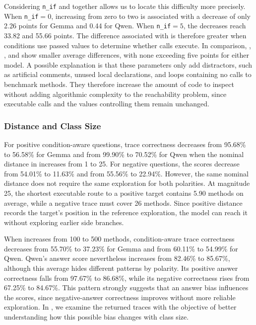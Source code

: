 

Considering \mbox{\texttt{n\_if}} and  together allows us to locate this difficulty more precisely. When \mbox{\texttt{n\_if}$=0$}, increasing  from zero to two is associated with a decrease of only 2.26 points for Gemma and 0.44 for Qwen. When \mbox{\texttt{n\_if}$=5$}, the decreases reach 33.82 and 55.66 points. The difference associated with  is therefore greater when conditions use passed values to determine whether calls execute. In comparison, , , and  show smaller average differences, with none exceeding five points for either model. A possible explanation is that these parameters only add distractors, such as artificial comments, unused local declarations, and loops containing no calls to benchmark methods. They therefore increase the amount of code to inspect without adding algorithmic complexity to the reachability problem, since executable calls and the values controlling them remain unchanged.

\subsubsection{Distance and Class Size}

For positive condition-aware questions, trace correctness decreases from 95.68\% to 56.58\% for Gemma and from 99.90\% to 70.52\% for Qwen when the nominal distance in  increases from 1 to 25. For negative questions, the scores decrease from 54.01\% to 11.63\% and from 55.56\% to 22.94\%. However, the same nominal distance does not require the same exploration for both polarities. At magnitude 25, the shortest executable route to a positive target contains 5.90 methods on average, while a negative trace must cover 26 methods. Since positive distance records the target's position in the reference exploration, the model can reach it without exploring earlier side branches.

When  increases from 100 to 500 methods, condition-aware trace correctness decreases from 55.70\% to 37.23\% for Gemma and from 60.11\% to 54.99\% for Qwen. Qwen's answer score nevertheless increases from 82.46\% to 85.67\%, although this average hides different patterns by polarity. Its positive answer correctness falls from 97.67\% to 86.68\%, while its negative correctness rises from 67.25\% to 84.67\%. This pattern strongly suggests that an answer bias influences the scores, since negative-answer correctness improves without more reliable exploration. In , we examine the returned traces with the objective of better understanding how this possible bias changes with class size.

